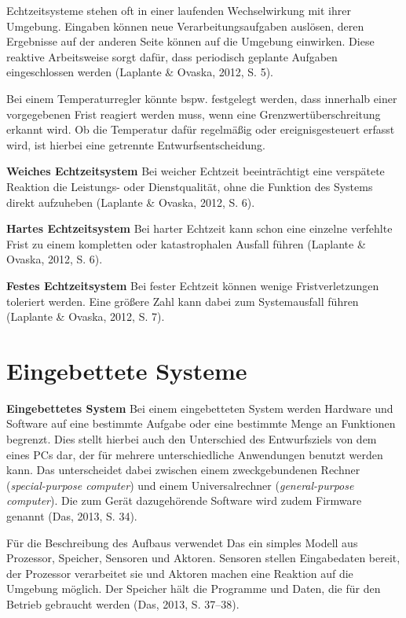 Echtzeitsysteme stehen oft in einer laufenden Wechselwirkung mit ihrer Umgebung. Eingaben k{\"o}nnen neue Verarbeitungsaufgaben ausl{\"o}sen, deren Ergebnisse auf der anderen Seite k{\"o}nnen auf die Umgebung einwirken. Diese reaktive Arbeitsweise sorgt daf{\"u}r, dass periodisch geplante Aufgaben eingeschlossen werden (Laplante \& Ovaska, 2012, S. 5).

Bei einem Temperaturregler k{\"o}nnte bspw. festgelegt werden, dass innerhalb einer vorgegebenen Frist reagiert werden muss, wenn eine Grenzwert{\"u}berschreitung erkannt wird. Ob die Temperatur daf{\"u}r regelm{\"a}{\ss}ig oder ereignisgesteuert erfasst wird, ist hierbei eine getrennte Entwurfsentscheidung.

\textbf{Weiches Echtzeitsystem} Bei weicher Echtzeit beeintr{\"a}chtigt eine versp{\"a}tete Reaktion die Leistungs- oder Dienstqualit{\"a}t, ohne die Funktion des Systems direkt aufzuheben (Laplante \& Ovaska, 2012, S. 6).

\textbf{Hartes Echtzeitsystem} Bei harter Echtzeit kann schon eine einzelne verfehlte Frist zu einem kompletten oder katastrophalen Ausfall f{\"u}hren (Laplante \& Ovaska, 2012, S. 6).

\textbf{Festes Echtzeitsystem} Bei fester Echtzeit k{\"o}nnen wenige Fristverletzungen toleriert werden. Eine gr{\"o}{\ss}ere Zahl kann dabei zum Systemausfall f{\"u}hren (Laplante \& Ovaska, 2012, S. 7).

\section{Eingebettete Systeme}
\textbf{Eingebettetes System} Bei einem eingebetteten System werden Hardware und Software auf eine bestimmte Aufgabe oder eine bestimmte Menge an Funktionen begrenzt. Dies stellt hierbei auch den Unterschied des Entwurfsziels von dem eines PCs dar, der f{\"u}r mehrere unterschiedliche Anwendungen benutzt werden kann. Das unterscheidet dabei zwischen einem zweckgebundenen Rechner (\emph{special-purpose computer}) und einem Universalrechner (\emph{general-purpose computer}). Die zum Ger{\"a}t dazugeh{\"o}rende Software wird zudem Firmware genannt (Das, 2013, S. 34).

F{\"u}r die Beschreibung des Aufbaus verwendet Das ein simples Modell aus Prozessor, Speicher, Sensoren und Aktoren. Sensoren stellen Eingabedaten bereit, der Prozessor verarbeitet sie und Aktoren machen eine Reaktion auf die Umgebung m{\"o}glich. Der Speicher h{\"a}lt die Programme und Daten, die f{\"u}r den Betrieb gebraucht werden (Das, 2013, S. 37--38).

